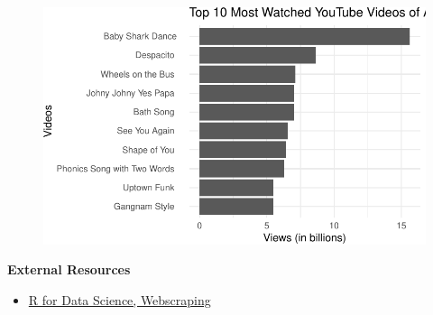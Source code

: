 \documentclass[
  letterpaper,
  DIV=11,
  numbers=noendperiod]{scrartcl}
\providecommand{\tightlist}{%
  \setlength{\itemsep}{0pt}\setlength{\parskip}{0pt}}\usepackage{longtable,booktabs,array}
\begin{document}
\begin{figure}[H]

{\centering \includegraphics{118_O_webscraping_tables_files/figure-pdf/unnamed-chunk-10-1.pdf}

}

\end{figure}

\begin{tcolorbox}[enhanced jigsaw, breakable, opacityback=0, toprule=.15mm, bottomrule=.15mm, leftrule=.75mm, arc=.35mm, rightrule=.15mm, colback=white, left=2mm]

\textbf{External Resources}\vspace{2mm}

\begin{itemize}
\tightlist
\item
  \href{https://r4ds.hadley.nz/webscraping}{R for Data Science,
  Webscraping}
\end{itemize}

\end{tcolorbox}
\end{document}

